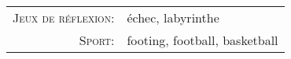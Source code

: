 \begin{tabular}{rl}
	\textsc{Jeux de réflexion:} & échec, labyrinthe             \\
	\textsc{Sport:}             & footing, football, basketball \\
\end{tabular}